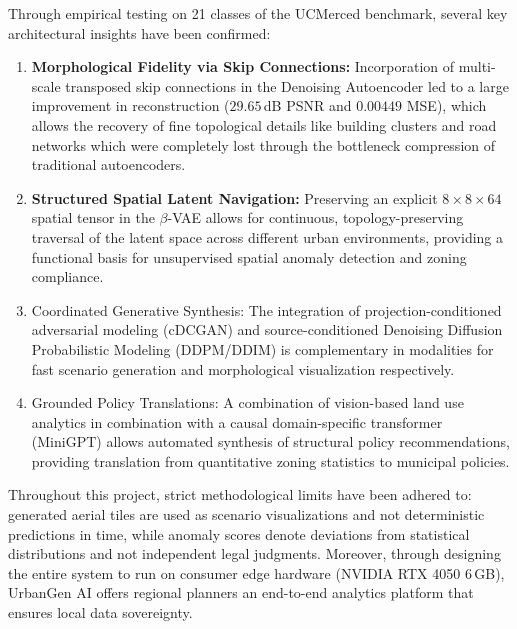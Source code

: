 \documentclass[conference]{IEEEtran}
\begin{document}
Through empirical testing on 21 classes of the UCMerced benchmark, several key architectural insights have been confirmed:
\begin{enumerate}
    \item \textbf{Morphological Fidelity via Skip Connections:} Incorporation of multi-scale transposed skip connections in the Denoising Autoencoder led to a large improvement in reconstruction ($29.65$\,dB PSNR and $0.00449$ MSE), which allows the recovery of fine topological details like building clusters and road networks which were completely lost through the bottleneck compression of traditional autoencoders.
    \item \textbf{Structured Spatial Latent Navigation:} Preserving an explicit $8 \times 8 \times 64$ spatial tensor in the $\beta$-VAE allows for continuous, topology-preserving traversal of the latent space across different urban environments, providing a functional basis for unsupervised spatial anomaly detection and zoning compliance.
    \item Coordinated Generative Synthesis: The integration of projection-conditioned adversarial modeling (cDCGAN) and source-conditioned Denoising Diffusion Probabilistic Modeling (DDPM/DDIM) is complementary in modalities for fast scenario generation and morphological visualization respectively.
     \item Grounded Policy Translations: A combination of vision-based land use analytics in combination with a causal domain-specific transformer (MiniGPT) allows automated synthesis of structural policy recommendations, providing translation from quantitative zoning statistics to municipal policies.
\end{enumerate}

Throughout this project, strict methodological limits have been adhered to: generated aerial tiles are used as scenario visualizations and not deterministic predictions in time, while anomaly scores denote deviations from statistical distributions and not independent legal judgments. Moreover, through designing the entire system to run on consumer edge hardware (NVIDIA RTX 4050 6\,GB), UrbanGen AI offers regional planners an end-to-end analytics platform that ensures local data sovereignty.
\end{document}
